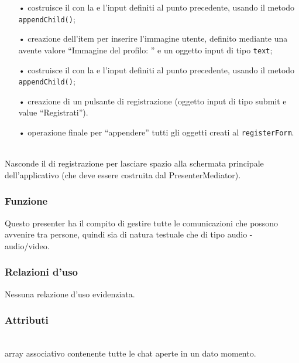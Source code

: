 \begin{description}
\begin{itemize}
		\item[•] costruisce il  con la  e l'input definiti al punto precedente, usando il metodo \texttt{appendChild()};
		\item[•] creazione dell'item per inserire l'immagine utente, definito mediante una  avente valore ``Immagine del profilo: '' e un oggetto input di tipo \texttt{text};
		\item[•] costruisce il  con la  e l'input definiti al punto precedente, usando il metodo \texttt{appendChild()};
		\item[•] creazione di un pulsante di registrazione (oggetto input di tipo submit e value ``Registrati'').
		\item[•] operazione finale per ``appendere'' tutti  gli oggetti creati al \texttt{registerForm}.
	\end{itemize}
	
	\item{}\\
	Nasconde il  di registrazione per lasciare spazio alla schermata principale dell'applicativo (che deve essere costruita dal PresenterMediator).

\end{description}


\subsubsection*{Funzione}
Questo presenter ha il compito di gestire tutte le comunicazioni che possono avvenire tra persone, quindi sia di natura testuale che di tipo audio - audio/video.

\subsubsection*{Relazioni d'uso}
Nessuna relazione d'uso evidenziata.

\subsubsection*{Attributi}
\begin{description}
\item{}\\
  array associativo contenente tutte le chat aperte in un dato momento.
\end{description}

